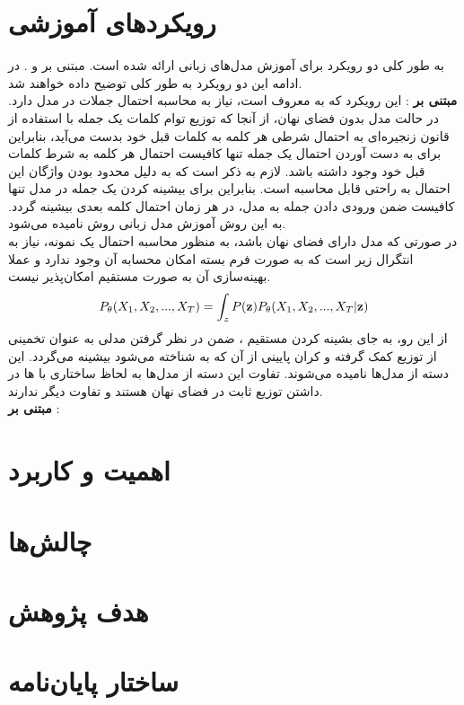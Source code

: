 \section{رویکردهای آموزشی}
به طور کلی دو رویکرد برای آموزش مدل‌های زبانی ارائه شده است. مبتنی بر \likelihood{} و 
.
در ادامه این دو رویکرد به طور کلی توضیح داده خواهند شد.
\\
{\bf مبتنی بر \likelihood{}}:
این رویکرد که به 
معروف است، نیاز به محاسبه احتمال جملات در مدل دارد. در حالت مدل بدون فضای نهان، از آنجا که توزیع توام کلمات یک جمله با استفاده از قانون زنجیره‌ای به احتمال شرطی هر کلمه به کلمات قبل خود بدست می‌آید، بنابراین برای به دست آوردن احتمال یک جمله تنها کافیست احتمال هر کلمه به شرط کلمات قبل خود وجود داشته باشد. لازم به ذکر است که به دلیل محدود بودن واژگان این احتمال به راحتی قابل محاسبه است. بنابراین برای بیشینه کردن \likelihood{} یک جمله در مدل تنها کافیست ضمن ورودی دادن جمله به مدل، در هر زمان احتمال کلمه بعدی بیشینه گردد. به این روش آموزش مدل زبانی روش 
نامیده می‌شود.
\\
در صورتی که مدل دارای فضای نهان باشد، به منظور محاسبه احتمال یک نمونه، نیاز به انتگرال زیر است که به صورت فرم بسته امکان محسابه آن وجود ندارد و عملا بهینه‌سازی آن به صورت مستقیم امکان‌پذیر نیست.
\begin{align}
P_\theta(X_1, X_2, ... , X_T) = \int_z P({\bf z})P_\theta(X_1, X_2, ... , X_T|{\bf z})
\end{align}
 از این رو، به جای بشینه کردن مستقیم \likelihood{}، ضمن در نظر گرفتن مدلی به عنوان تخمینی از توزیع
 کمک گرفته و کران پایینی از آن که به  شناخته می‌شود بیشینه می‌گردد. این دسته از مدل‌ها 
نامیده می‌شوند. تفاوت این دسته از مدل‌ها به لحاظ ساختاری با 
ها
در داشتن توزیع ثابت در فضای نهان هستند و تفاوت دیگر ندارند.
\\
{\bf مبتنی بر \gan{}}:
\section{اهمیت و کاربرد}

\section{چالش‌ها}

\section{هدف پژوهش}


\section{ساختار پایان‌نامه}




